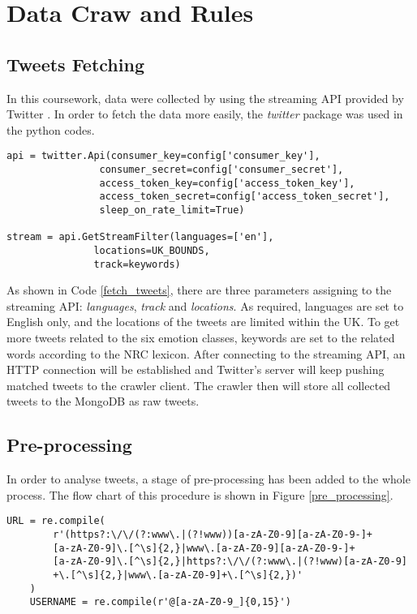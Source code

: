 \section{Data Craw and Rules}

\subsection{Tweets Fetching}

In this coursework, data were collected by using the streaming API provided by Twitter \cite{twitter_streaming}. In order to fetch the data more easily, the \textit{twitter} package was used in the python codes.


\begin{lstlisting}[caption={Fetch Tweets},captionpos=b,label={fetch_tweets}]
api = twitter.Api(consumer_key=config['consumer_key'],
                consumer_secret=config['consumer_secret'],
                access_token_key=config['access_token_key'],
                access_token_secret=config['access_token_secret'],
                sleep_on_rate_limit=True)

stream = api.GetStreamFilter(languages=['en'],
               locations=UK_BOUNDS,
               track=keywords)
\end{lstlisting}

As shown in Code \ref{fetch_tweets}, there are three parameters assigning to the streaming API: \textit{languages}, \textit{track} and \textit{locations}. As required, languages are set to English only, and the locations of the tweets are limited within the UK. To get more tweets related to the six emotion classes, keywords are set to the related words according to the NRC lexicon. After connecting to the streaming API, an HTTP connection will be established and Twitter's server will keep pushing matched tweets to the crawler client. The crawler then will store all collected tweets to the MongoDB as raw tweets. 

\subsection{Pre-processing}

In order to analyse tweets, a stage of pre-processing has been added to the whole process. The flow chart of this procedure is shown in Figure \ref{pre_processing}.

\begin{lstlisting}[caption={Regular Expression},captionpos=b,label={regex}]
    URL = re.compile(
        r'(https?:\/\/(?:www\.|(?!www))[a-zA-Z0-9][a-zA-Z0-9-]+
        [a-zA-Z0-9]\.[^\s]{2,}|www\.[a-zA-Z0-9][a-zA-Z0-9-]+
        [a-zA-Z0-9]\.[^\s]{2,}|https?:\/\/(?:www\.|(?!www)[a-zA-Z0-9]
        +\.[^\s]{2,}|www\.[a-zA-Z0-9]+\.[^\s]{2,})'
    )
    USERNAME = re.compile(r'@[a-zA-Z0-9_]{0,15}')
\end{lstlisting}

